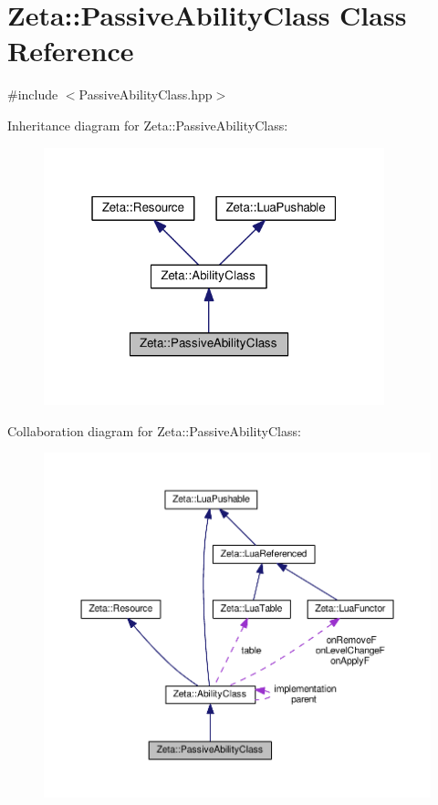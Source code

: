 \hypertarget{classZeta_1_1PassiveAbilityClass}{\section{Zeta\+:\+:Passive\+Ability\+Class Class Reference}
\label{classZeta_1_1PassiveAbilityClass}
}


{\ttfamily \#include $<$Passive\+Ability\+Class.\+hpp$>$}



Inheritance diagram for Zeta\+:\+:Passive\+Ability\+Class\+:\nopagebreak
\begin{figure}[H]
\begin{center}
\leavevmode
\includegraphics[width=280pt]{classZeta_1_1PassiveAbilityClass__inherit__graph}
\end{center}
\end{figure}


Collaboration diagram for Zeta\+:\+:Passive\+Ability\+Class\+:\nopagebreak
\begin{figure}[H]
\begin{center}
\leavevmode
\includegraphics[width=350pt]{classZeta_1_1PassiveAbilityClass__coll__graph}
\end{center}
\end{figure}
